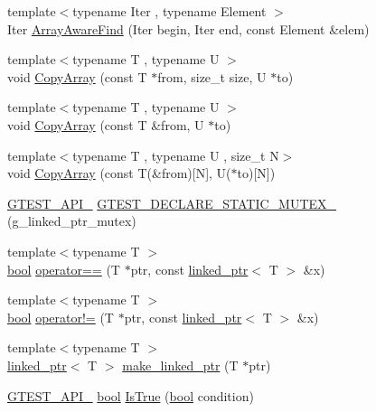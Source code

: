 \begin{DoxyCompactItemize}
\item 
{\footnotesize template$<$typename Iter , typename Element $>$ }\\Iter \hyperlink{namespacetesting_1_1internal_a94a857fe6ff32cf4fdc4769a4071f239}{Array\+Aware\+Find} (Iter begin, Iter end, const Element \&elem)
\item 
{\footnotesize template$<$typename T , typename U $>$ }\\void \hyperlink{namespacetesting_1_1internal_afb1b9728aaaf6d9fe6246a19cfe3f7f5}{Copy\+Array} (const T $\ast$from, size\+\_\+t size, U $\ast$to)
\item 
{\footnotesize template$<$typename T , typename U $>$ }\\void \hyperlink{namespacetesting_1_1internal_a84d0e746ba0827cc52b53d22000de0e8}{Copy\+Array} (const T \&from, U $\ast$to)
\item 
{\footnotesize template$<$typename T , typename U , size\+\_\+t N$>$ }\\void \hyperlink{namespacetesting_1_1internal_a1e7ae855686720615dcd5754c8181c62}{Copy\+Array} (const T(\&from)\mbox{[}N\mbox{]}, U($\ast$to)\mbox{[}N\mbox{]})
\item 
\hyperlink{gtest-port_8h_aa73be6f0ba4a7456180a94904ce17790}{G\+T\+E\+S\+T\+\_\+\+A\+P\+I\+\_\+} \hyperlink{namespacetesting_1_1internal_ad7c5625384cf5f6b714188f274537ef6}{G\+T\+E\+S\+T\+\_\+\+D\+E\+C\+L\+A\+R\+E\+\_\+\+S\+T\+A\+T\+I\+C\+\_\+\+M\+U\+T\+E\+X\+\_\+} (g\+\_\+linked\+\_\+ptr\+\_\+mutex)
\item 
{\footnotesize template$<$typename T $>$ }\\\hyperlink{classbool}{bool} \hyperlink{namespacetesting_1_1internal_ad1cb54a206a209ddace17a05359d38ae}{operator==} (T $\ast$ptr, const \hyperlink{classtesting_1_1internal_1_1linked__ptr}{linked\+\_\+ptr}$<$ T $>$ \&x)
\item 
{\footnotesize template$<$typename T $>$ }\\\hyperlink{classbool}{bool} \hyperlink{namespacetesting_1_1internal_a6910869259f8f31825b471e9190fa09a}{operator!=} (T $\ast$ptr, const \hyperlink{classtesting_1_1internal_1_1linked__ptr}{linked\+\_\+ptr}$<$ T $>$ \&x)
\item 
{\footnotesize template$<$typename T $>$ }\\\hyperlink{classtesting_1_1internal_1_1linked__ptr}{linked\+\_\+ptr}$<$ T $>$ \hyperlink{namespacetesting_1_1internal_a0d79fad1f772844eff35dfe955f24fd6}{make\+\_\+linked\+\_\+ptr} (T $\ast$ptr)
\item 
\hyperlink{gtest-port_8h_aa73be6f0ba4a7456180a94904ce17790}{G\+T\+E\+S\+T\+\_\+\+A\+P\+I\+\_\+} \hyperlink{classbool}{bool} \hyperlink{namespacetesting_1_1internal_a527b9bcc13669b9a16400c8514266254}{Is\+True} (\hyperlink{classbool}{bool} condition)

\end{DoxyCompactItemize}
